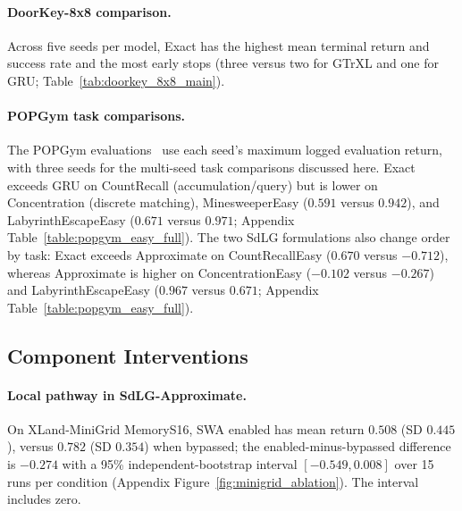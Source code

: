 \paragraph{DoorKey-8x8 comparison.}
Across five seeds per model, Exact has the highest mean terminal return and success rate and the most early stops (three versus two for GTrXL and one for GRU; Table~\ref{tab:doorkey_8x8_main}).

\begin{table}[t]
\centering\footnotesize
\setlength{\tabcolsep}{3pt}
\caption{\textbf{DoorKey-8x8 terminal-policy evaluation.} Five-seed mean $\pm$ sample SD; E/C counts early stops versus caps. Appendix~\ref{app:doorkey_8x8} gives individual runs.}
\label{tab:doorkey_8x8_main}

\end{table}

\paragraph{POPGym task comparisons.}
The POPGym evaluations~\cite{morad2023popgym} use each seed's maximum logged evaluation return, with three seeds for the multi-seed task comparisons discussed here. Exact exceeds GRU on CountRecall (accumulation/query) but is lower on Concentration (discrete matching), MinesweeperEasy ($0.591$ versus $0.942$), and LabyrinthEscapeEasy ($0.671$ versus $0.971$; Appendix Table~\ref{table:popgym_easy_full}). The two SdLG formulations also change order by task: Exact exceeds Approximate on CountRecallEasy ($0.670$ versus $-0.712$), whereas Approximate is higher on ConcentrationEasy ($-0.102$ versus $-0.267$) and LabyrinthEscapeEasy ($0.967$ versus $0.671$; Appendix Table~\ref{table:popgym_easy_full}).

\subsection{Component Interventions}
\label{sec:optional_controls}

\paragraph{Local pathway in SdLG-Approximate.}
On XLand-MiniGrid MemoryS16, SWA enabled has mean return $0.508$ (SD $0.445$), versus $0.782$ (SD $0.354$) when bypassed; the enabled-minus-bypassed difference is $-0.274$ with a 95\% independent-bootstrap interval $[-0.549,0.008]$ over 15 runs per condition (Appendix Figure~\ref{fig:minigrid_ablation}). The interval includes zero.


